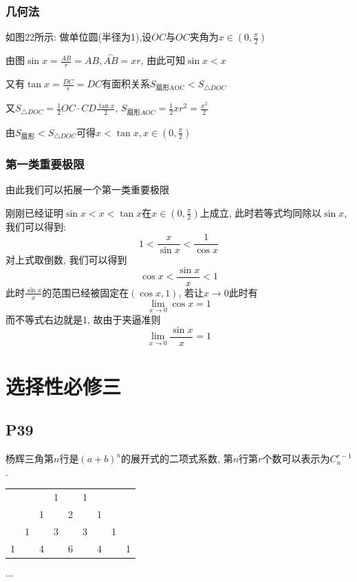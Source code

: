 \documentclass{book}
\begin{document}
    \subsection{几何法}

    如图22所示: 做单位圆(半径为1),设$OC$与$OC$夹角为$\displaystyle x\in\left( 0,\frac{\pi}{2} \right)$

    由图$\displaystyle \sin x=\frac{AB}{r}=AB,\overset{\frown }{AB}=xr$, 由此可知$\sin x<x$

    又有$\displaystyle \tan x=\frac{DC}{r}=DC$有面积关系$S_{\text{扇形AOC}}<S_{\triangle DOC}$

    又$\displaystyle S_{\triangle DOC}=\frac{1}{2}OC\cdot CD\frac{\tan x}{2}$, $\displaystyle S_{\text{扇形}AOC}=\frac{1}{2}xr^2=\frac{x^2}{2}$

    由$S_{\text{扇形}}<S_{\triangle DOC}$可得$\displaystyle x<\tan x,x\in\left( 0,\frac{\pi}{2} \right)$

    \subsection{第一类重要极限}
    由此我们可以拓展一个\textcolor[rgb]{0.38,0.11,0.2}{第一类重要极限}

    刚刚已经证明$\sin x<x<\tan x$在$\displaystyle x\in\left( 0,\frac{\pi}{2} \right)$上成立, 此时若等式均同除以$\sin x$, 我们可以得到:$$1<\frac{x}{\sin x}<\frac{1}{\cos x}$$对上式取倒数, 我们可以得到$$\cos x<\frac{\sin x}{x}<1$$此时$\displaystyle \frac{\sin x}{x}$的范围已经被固定在$\left( \cos x,1 \right)$, 若让$x\rightarrow 0$此时有$$\lim_{x \to 0} \cos x=1$$而不等式右边就是1, 故由于\textcolor[rgb]{0.75,0.17,0.22}{夹逼准则}$$\lim_{x \to 0} \frac{\sin x}{x}=1 $$

    \chapter{选择性必修三}

    \section{\textcolor[rgb]{0.11,0.65,0.52}{P39}}
    \textcolor[rgb]{0.38,0.11,0.2}{杨辉三角}第$n$行是$(a+b)^n$的展开式的二项式系数, 第$n$行第$r$个数可以表示为$C_n^{r-1}$.

    \begin{table}[htbp]
        \centering
        \begin{tabular}{lllllllll}
          &   &   & 1 &   & 1 &   &   &   \\
          &   & 1 &   & 2 &   & 1 &   &   \\
          & 1 &   & 3 &   & 3 &   & 1 &   \\
        1 &   & 4 &   & 6 &   & 4 &   & 1 \\
        \end{tabular}
        \end{table}
    \begin{center}
        $\cdots$
    \end{center}
    
\end{document}
